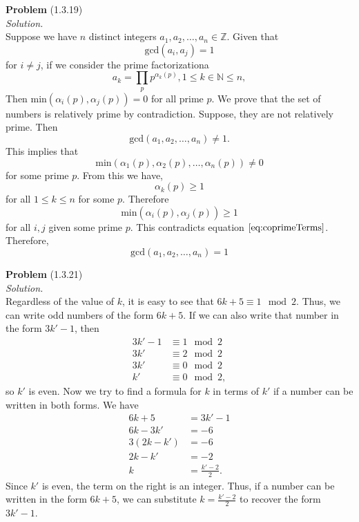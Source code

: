 \documentclass[12 pt]{amsart}
\begin{document}
\phantom{\quad} \vfill
\noindent
\textbf{Problem} (1.3.19) \\[4ex]
\emph{Solution.} \\[2ex]
  Suppose we have $n$ distinct integers $a_1, a_2, \ldots, a_n \in \mathbb{Z}$.
  Given that 
  \begin{equation} \label{eq:coprimeTerms}
    \text{gcd}(a_i, a_j) = 1
  \end{equation}
  for $i \neq j$, if we consider the prime factorizationa
  \[
    a_k = \prod_p p^{\alpha_k(p)}, 1 \leq k\in \mathbb{N} \leq n,
  \]
  Then $\text{min}\left(\alpha_i(p), \alpha_j(p)\right) = 0$ for all prime $p$.
  We prove that the set of numbers is relatively prime by contradiction.
  Suppose, they are not relatively prime.
  Then 
  \[
    \text{gcd}(a_1, a_2, \ldots, a_n) \neq 1.
  \]
  This implies that 
  \[
    \text{min}(\alpha_1(p), \alpha_2(p), \ldots, \alpha_n(p)) \neq 0
  \]
  for some prime $p$. 
  From this we have, 
  \[
    \alpha_k(p) \geq 1
  \]
  for all $1 \leq k \leq n$ for some $p$.
  Therefore
  \begin{equation}
    \text{min}(\alpha_i(p), \alpha_j(p)) \geq 1
  \end{equation}
  for all $i, j$ given some prime $p$.
  This contradicts equation $\ref{eq:coprimeTerms}$.
  Therefore, 
  \[
    \text{gcd}(a_1, a_2, \ldots, a_n) = 1
  \]
\vfill
\newpage



\phantom{\quad} \vfill
\noindent
\textbf{Problem} (1.3.21) \\[4ex]
\emph{Solution.} \\[2ex]
  Regardless of the value of $k$, it is easy to see that
  $6k + 5 \equiv 1 \mod 2$.
  Thus, we can write odd numbers of the form $6k + 5$.
  If we can also write that number in the form $3k' - 1$, then
  \begin{align*}
    3k' - 1 &\equiv 1 \mod 2 \\
        3k' &\equiv 2 \mod 2 \\
        3k' &\equiv 0 \mod 2 \\
        k'  &\equiv 0 \mod 2,
  \end{align*}
  so $k'$ is even.
  Now we try to find a formula for $k$ in terms of $k'$ if a number
  can be written in both forms.
  We have
  \begin{align*}
    6k + 5 &= 3k' - 1 \\
    6k - 3k' &= -6 \\
    3(2k - k') &= -6 \\
    2k - k' &= -2 \\
    k &= \frac{k' - 2}{2}.
  \end{align*}
  Since $k'$ is even, the term on the right is an integer. 
  Thus, if a number can be written in the form 
  $6k + 5$, we can substitute $k = \frac{k' - 2}{2}$ to recover
  the form $3k'-1$. 
\vfill
\newpage
\end{document}
